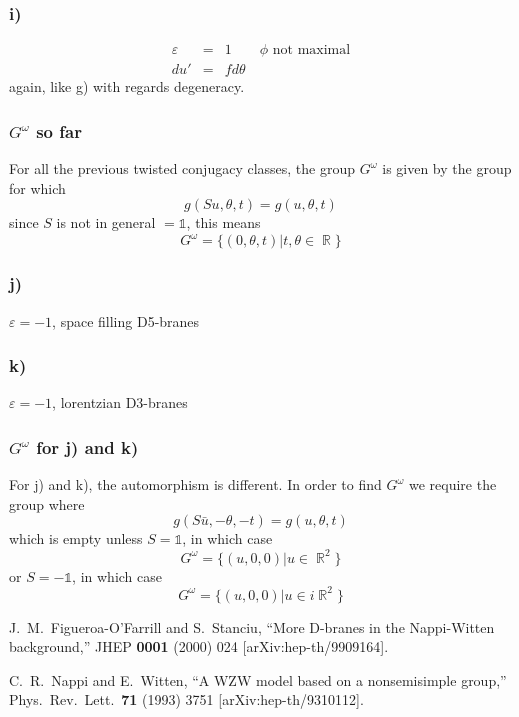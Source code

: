 \documentclass[11pt, a4paper]{article}
\DeclareMathOperator{\real}{{\mathbb R}}
\newcommand{\1}{\mathbb{1}}
\begin{document}
\subsubsection{i)}
\begin{eqnarray}
  \label{eq:i}
  \varepsilon&=&1\qquad \text{$\phi$ not maximal}\\\nonumber
  du'&=&fd\theta
\end{eqnarray}
again, like g) with regards degeneracy.

\subsubsection{$G^\omega$ so far}
For all the previous twisted conjugacy classes, the group $G^\omega$ is given by
the group for which
\begin{equation}
  \label{eq:Gomega:1}
  g(Su,\theta,t)=g(u,\theta,t)
\end{equation}
since $S$ is not in general $=\1$, this means
\begin{equation}
  \label{eq:Gomega:2}
  G^\omega=\{(0,\theta,t)|t,\theta\in\real\}
\end{equation}

\subsubsection{j)}
$\varepsilon=-1$, space filling D5-branes

\subsubsection{k)}
$\varepsilon=-1$, lorentzian D3-branes

\subsubsection{$G^\omega$ for j) and k)}
For j) and k), the automorphism is different. In order to find $G^\omega$ we
require the group where
\begin{equation}
  \label{eq:Gomega:3}
  g(S\bar u,-\theta,-t)=g(u,\theta,t)
\end{equation}
which is empty unless $S=\1$, in which case
\begin{equation}
  \label{eq:Gomega:4}
  G^\omega=\{(u,0,0)|u\in\real^2\}
\end{equation}
or $S=-\1$, in which case
\begin{equation}
  \label{eq:Gomega:5}
  G^\omega=\{(u,0,0)|u\in i\real^2\}
\end{equation}

\begin{thebibliography}{99}
  J.~M.~Figueroa-O'Farrill and S.~Stanciu,
  ``More D-branes in the Nappi-Witten background,''
  JHEP {\bf 0001} (2000) 024
  [arXiv:hep-th/9909164].

  C.~R.~Nappi and E.~Witten,
  ``A WZW model based on a nonsemisimple group,''
  Phys.\ Rev.\ Lett.\  {\bf 71} (1993) 3751
  [arXiv:hep-th/9310112].

\end{thebibliography}
\end{document}
